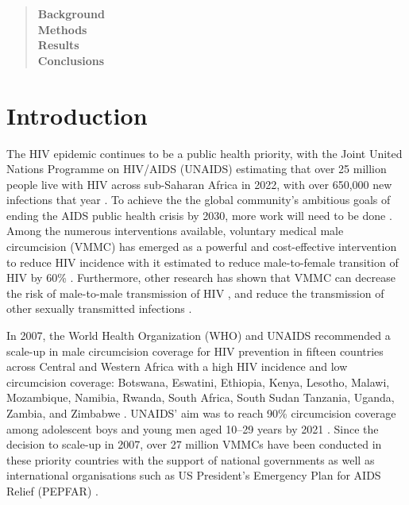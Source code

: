 \documentclass{article}
\begin{document}
\begin{abstract}
  \noindent \textbf{Background} \\

  \noindent \textbf{Methods} \\

  \noindent \textbf{Results} \\

  \noindent \textbf{Conclusions} \\

\end{abstract}
\newpage


\section*{Introduction}


The HIV epidemic continues to be a public health priority, with the Joint United Nations Programme on HIV/AIDS (UNAIDS) estimating that over 25 million people live with HIV across sub-Saharan Africa in 2022, with over 650,000 new infections that year \cite{UNAIDSStats}. To achieve the the global community's ambitious goals of ending the AIDS public health crisis by 2030, more work will need to be done \cite{UNAIDSStrategy}. Among the numerous interventions available, voluntary medical male circumcision (VMMC) has emerged as a powerful and cost-effective intervention to reduce HIV incidence \cite{bansi2023cost} with it estimated to reduce male-to-female transition of HIV by 60\% \cite{gray2007male, bailey2007male, auvert2005randomized, gray2012effectiveness, grund2017association}. Furthermore, other research has shown that VMMC can decrease the risk of male-to-male transmission of HIV \cite{pintye2019benefits}, and reduce the transmission of other sexually transmitted infections \cite{tobian2009male}. 

In 2007, the World Health Organization (WHO) and UNAIDS recommended a scale-up in male circumcision coverage for HIV prevention in fifteen countries across Central and Western Africa with a high HIV incidence and low circumcision coverage: Botswana, Eswatini, Ethiopia, Kenya, Lesotho, Malawi, Mozambique, Namibia, Rwanda, South Africa, South Sudan Tanzania, Uganda, Zambia, and Zimbabwe \cite{UNAIDSJoint, davis2018progress, WHOVoluntary2}. UNAIDS' aim was to reach 90\% circumcision coverage among adolescent boys and young men aged 10--29 years by 2021 \cite{WHOFramework}. Since the decision to scale-up in 2007, over 27 million VMMCs have been conducted in these priority countries with the support of national governments as well as international organisations such as US President’s Emergency Plan for AIDS Relief (PEPFAR) \cite{WHOHIVProg}.
\end{document}
